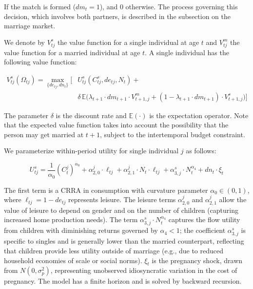\documentclass[12pt]{article}
\begin{document}
If the match is formed ($dm_t = 1$), and 0 otherwise. The process governing this decision, which involves both partners, is described in the subsection on the marriage market.

We denote by $V_{tj}^s$ the value function for a single individual at age $t$ and $V_{tj}^m$ the value function for a married individual at age $t$. A single individual has the following value function:

\begin{equation}
\begin{aligned}
V_{tj}^s(\Omega_{tj}) = \max_{\{de_{tj}, dn_t\}} \Big[ &U_{tj}^s(C_{tj}^s, de_{tj}, N_t) + \\
&\delta \, \mathbb{E}\big(\lambda_{t+1} \cdot dm_{t+1} \cdot V_{t+1,j}^m + (1 - \lambda_{t+1} \cdot dm_{t+1}) \cdot V_{t+1,j}^s\big) \Big]
\end{aligned}
\label{eq:single_value}
\end{equation}

The parameter $\delta$ is the discount rate and $\mathbb{E}(\cdot)$ is the expectation operator. Note that the expected value function takes into account the possibility that the person may get married at $t+1$, subject to the intertemporal budget constraint.

We parameterize within-period utility for single individual $j$ as follows:

\begin{equation}
U_{tj}^s = \frac{1}{\alpha_0}(C_t^j)^{\alpha_0} + \alpha_{2,0}^j \cdot \ell_{tj} + \alpha_{2,1}^j \cdot N_t \cdot \ell_{tj} + \alpha_{3,j}^s \cdot N_t^{\alpha_4} + dn_t \cdot \xi_t
\label{eq:single_utility}
\end{equation}

The first term is a CRRA in consumption with curvature parameter $\alpha_0 \in (0,1)$, where $\ell_{tj} = 1 - de_{tj}$ represents leisure. The leisure terms $\alpha_{2,0}^j$ and $\alpha_{2,1}^j$ allow the value of leisure to depend on gender and on the number of children (capturing increased home production needs). The term $\alpha_{3,j}^s \cdot N_t^{\alpha_4}$ captures the flow utility from children with diminishing returns governed by $\alpha_4 < 1$; the coefficient $\alpha_{3,j}^s$ is specific to singles and is generally lower than the married counterpart, reflecting that children provide less utility outside of marriage (e.g., due to reduced household economies of scale or social norms). $\xi_t$ is the pregnancy shock, drawn from $N(0, \sigma_p^2)$, representing unobserved idiosyncratic variation in the cost of pregnancy. The model has a finite horizon and is solved by backward recursion.
\end{document}
